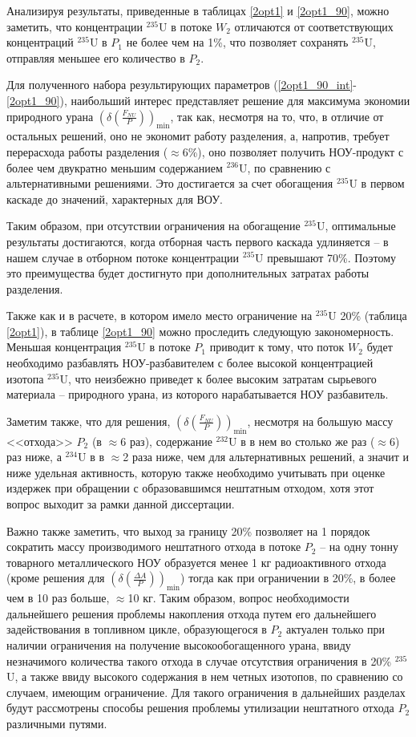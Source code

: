 Анализируя результаты, приведенные в таблицах \ref{2opt1} и \ref{2opt1_90}, можно заметить, что концентрации $^{235}$U в потоке $W_2$ отличаются от соответствующих концентраций $^{235}$U в  $P_1$ не более чем на 1\%, что позволяет сохранять $^{235}$U, отправляя меньшее его количество в $P_2$.

Для полученного набора результирующих параметров (\ref{2opt1_90_int}-\ref{2opt1_90}), наибольший интерес представляет решение для максимума экономии природного урана $(\delta(\frac{F_{NU}}{P}))_\text{min}$, так как, несмотря на то, что, в отличие от остальных решений, оно не экономит работу разделения, а, напротив, требует перерасхода работы разделения ($\approx$6\%), оно позволяет получить НОУ-продукт с более чем двукратно меньшим содержанием $^{236}$U, по сравнению с альтернативными решениями. Это достигается за счет обогащения $^{235}$U в первом каскаде до значений, характерных для ВОУ.

Таким образом, при отсутствии ограничения на обогащение $^{235}$U, оптимальные результаты достигаются, когда отборная часть первого каскада удлиняется -- в нашем случае в отборном потоке концентрации $^{235}$U превышают 70\%. Поэтому это преимущества будет достигнуто при дополнительных затратах работы разделения.

Также как и в расчете, в котором имело место ограничение на $^{235}$U 20\% (таблица \ref{2opt1}), в таблице \ref{2opt1_90} можно проследить следующую закономерность. Меньшая концентрация $^{235}$U в потоке $P_{1}$ приводит к тому, что поток $W_{2}$ будет необходимо разбавлять НОУ-разбавителем с более высокой концентрацией изотопа $^{235}$U, что неизбежно приведет к более высоким затратам сырьевого материала -- природного урана, из которого нарабатывается НОУ разбавитель.

Заметим также, что для решения, $(\delta(\frac{F_{NU}}{P}))_\text{min}$, несмотря на большую массу <<отхода>> $P_{2}$ (в $\approx$6 раз), содержание $^{232}$U в в нем во столько же раз ($\approx$6) раз ниже, а $^{234}$U в в $\approx$2 раза ниже, чем для альтернативных решений, а значит и ниже удельная активность, которую также необходимо учитывать при оценке издержек при обращении с образовавшимся нештатным отходом, хотя этот вопрос выходит за рамки данной диссертации.

Важно также заметить, что выход за границу 20\% позволяет на 1 порядок сократить массу производимого нештатного отхода в потоке $P_{2}$ -- на одну тонну товарного металлического НОУ образуется менее 1 кг радиоактивного отхода (кроме решения для $(\delta(\frac{\Delta A}{P}))_\text{min}$) тогда как при ограничении в 20\%, в более чем в 10 раз больше, $\approx$10 кг. Таким образом, вопрос необходимости дальнейшего решения проблемы накопления отхода путем его дальнейшего задействования в топливном цикле, образующегося в $P_{2}$ актуален только при наличии ограничения на получение высокообогащенного урана, ввиду незначимого количества такого отхода в случае отсутствия ограничения в 20\% $^{235}$U, а также ввиду высокого содержания в нем четных изотопов, по сравнению со случаем, имеющим ограничение. Для такого ограничения в дальнейших разделах будут рассмотрены способы решения проблемы утилизации нештатного отхода $P_{2}$ различными путями. 



